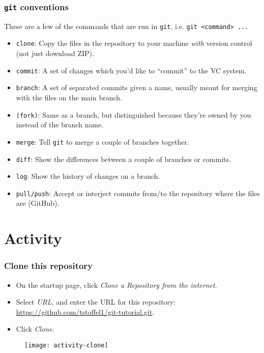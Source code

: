 \documentclass[9pt,handout]{beamer}
\begin{document}
%
\begin{frame}
  \frametitle{\texttt{git} conventions}
  These are a few of the commands that are run in \texttt{git}, i.e. \texttt{git <command> ...}
  \begin{itemize}
    \item \texttt{clone}: Copy the files in the repository to your machine \emph{with} version control (not just download ZIP). \pause
    \item \texttt{commit}: A set of changes which you'd like to ``commit'' to the VC system. \pause
    \item \texttt{branch}: A set of separated commits given a name, usually meant for merging with the files on the main branch. \pause
    \item \texttt{(fork)}: Same as a branch, but distinguished because they're owned by you instead of the branch name. \pause
    \item \texttt{merge}: Tell \texttt{git} to merge a couple of branches together. \pause
    \item \texttt{diff}: Show the differences between a couple of branches or commits. \pause
    \item \texttt{log}: Show the history of changes on a branch. \pause
    \item \texttt{pull/push}: Accept or interject commits from/to the repository where the files are (GitHub). \pause
  \end{itemize}
\end{frame}
%
\section{Activity}
%
\begin{frame}
  \frametitle{Clone this repository}
  \begin{itemize}
    \item On the startup page, click \emph{Clone a Repository from the internet}.
    \item Select \emph{URL}, and enter the URL for this repository: \url{https://github.com/tstoffel1/git-tutorial.git}.
    \item Click \emph{Clone}.
  \end{itemize}
  \begin{figure}
    \centering
    \texttt{[image: activity-clone]}
  \end{figure}
\end{frame}
%
\end{document}
